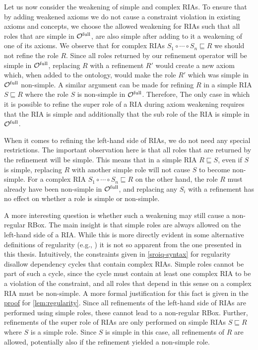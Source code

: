 
Let us now consider the weakening of simple and complex RIAs. To ensure that by adding weakened axioms we do not cause a constraint violation in existing axioms and concepts, we choose the allowed weakening for RIAs such that all roles that are simple in ${\mathcal{O}^\textnormal{full}}$, are also simple after adding to it a weakening of one of its axioms. We observe that for complex RIAs $S_1 \circ \cdots \circ S_n \sqsubseteq R$ we should not refine the role $R$. Since all roles returned by our refinement operator will be simple in ${\mathcal{O}^\textnormal{full}}$, replacing $R$ with a refinement $R'$ would create a new axiom which, when added to the ontology, would make the role $R'$ which was simple in ${\mathcal{O}^\textnormal{full}}$ non-simple. A similar argument can be made for refining $R$ in a simple RIA $S \sqsubseteq R$ where the role $S$ is non-simple in ${\mathcal{O}^\textnormal{full}}$. Therefore, The only case in which it is possible to refine the super role of a RIA during axiom weakening requires that the RIA is simple and additionally that the sub role of the RIA is simple in ${\mathcal{O}^\textnormal{full}}$.

When it comes to refining the left-hand side of RIAs, we do not need any special restrictions. The important observation here is that all roles that are returned by the refinement will be simple. This means that in a simple RIA $R \sqsubseteq S$, even if $S$ is simple, replacing $R$ with another simple role will not cause $S$ to become non-simple. For a complex RIA $S_1 \circ \cdots \circ S_n \sqsubseteq R$ on the other hand, the role $R$ must already have been non-simple in ${\mathcal{O}^\textnormal{full}}$, and replacing any $S_i$ with a refinement has no effect on whether a role is simple or non-simple.

A more interesting question is whether such a weakening may still cause a non-regular RBox. The main insight is that simple roles are always allowed on the left-hand side of a RIA. While this is more directly evident in some alternative definitions of regularity (e.g., \cite{rudolph2011foundations}) it is not so apparent from the one presented in this thesis. Intuitively, the constraints given in \cref{sroiq-syntax} for regularity disallow dependency cycles that contain complex RIAs. Simple roles cannot be part of such a cycle, since the cycle must contain at least one complex RIA to be a violation of the constraint, and all roles that depend in this sense on a complex RIA must be non-simple. A more formal justification for this fact is given in the \hyperref[proof:regularity]{proof} for \cref{lem:regularity}. Since all refinements of the left-hand side of RIAs are performed using simple roles, these cannot lead to a non-regular RBox. Further, refinements of the super role of RIAs are only performed on simple RIAs $S \sqsubseteq R$ where $S$ is a simple role. Since $S$ is simple in this case, all refinements of $R$ are allowed, potentially also if the refinement yielded a non-simple role.

